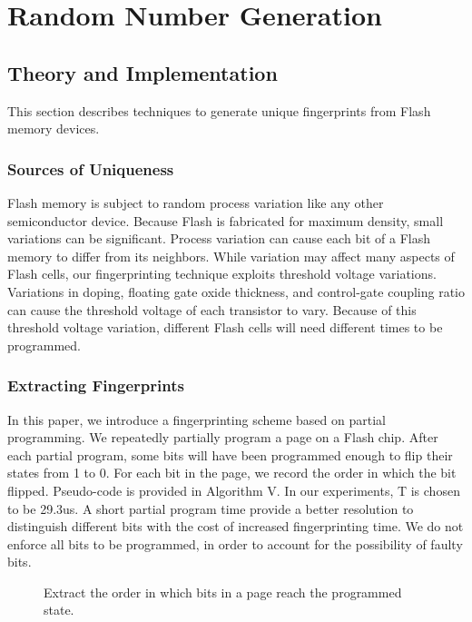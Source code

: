 \chapter{Random Number Generation} \label{sec:fingerprints}

\section{Theory and Implementation}

This section describes techniques to generate unique fingerprints from Flash memory devices.

\subsection{Sources of Uniqueness}

Flash memory is subject to random process variation like any other semiconductor device. Because Flash is fabricated for maximum density, small variations can be significant. Process variation can cause each bit of a Flash memory to differ from its neighbors. While variation may affect many aspects of Flash cells, our fingerprinting technique exploits threshold voltage variations. Variations in doping, floating gate oxide thickness, and control-gate coupling ratio can cause the threshold voltage of each transistor to vary. Because of this threshold voltage variation, different Flash cells will need different times to be programmed.

\subsection{Extracting Fingerprints}

In this paper, we introduce a fingerprinting scheme based on partial programming. We repeatedly partially program a page on a Flash chip. After each partial program, some bits will have been programmed enough to flip their states from 1 to 0. For each bit in the page, we record the order in which the bit flipped. Pseudo-code is provided in Algorithm V. In our experiments, T is chosen to be 29.3us. A short partial program time provide a better resolution to distinguish different bits with the cost of increased fingerprinting time. We do not enforce all bits to be programmed, in order to account for the possibility of faulty bits.

\begin{figure} 
\begin{center} 
 
\caption{Extract the order in which bits in a page reach the programmed state.}
\label{fig:extract_order} 
\vspace{-0.25in}
\end{center} 
\end{figure}

